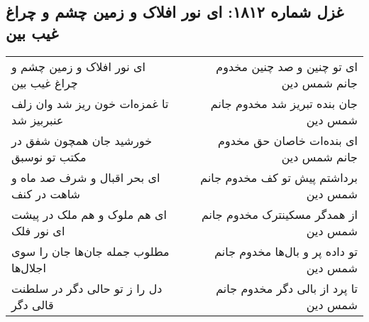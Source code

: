 \begin{center}
\section*{غزل شماره ۱۸۱۲: ای نور افلاک و زمین چشم و چراغ غیب بین}
\label{sec:1812}
\begin{longtable}{l p{0.5cm} r}
ای نور افلاک و زمین چشم و چراغ غیب بین
&&
ای تو چنین و صد چنین مخدوم جانم شمس دین
\\
تا غمزه‌ات خون ریز شد وان زلف عنبربیز شد
&&
جان بنده تبریز شد مخدوم جانم شمس دین
\\
خورشید جان همچون شفق در مکتب تو نوسبق
&&
ای بنده‌ات خاصان حق مخدوم جانم شمس دین
\\
ای بحر اقبال و شرف صد ماه و شاهت در کنف
&&
برداشتم پیش تو کف مخدوم جانم شمس دین
\\
ای هم ملوک و هم ملک در پیشت ای نور فلک
&&
از همدگر مسکینترک مخدوم جانم شمس دین
\\
مطلوب جمله جان‌ها جان را سوی اجلال‌ها
&&
تو داده پر و بال‌ها مخدوم جانم شمس دین
\\
دل را ز تو حالی دگر در سلطنت قالی دگر
&&
تا پرد از بالی دگر مخدوم جانم شمس دین
\\
\end{longtable}
\end{center}
